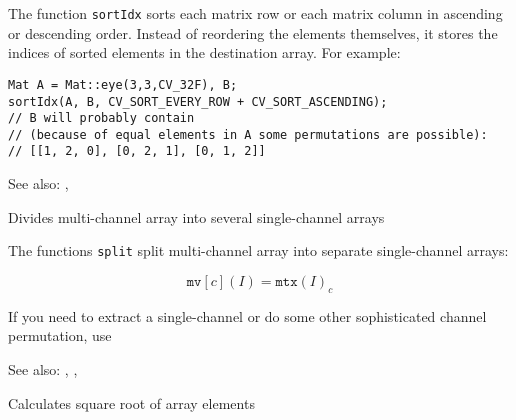 The function \texttt{sortIdx} sorts each matrix row or each matrix column in ascending or descending order. Instead of reordering the elements themselves, it stores the indices of sorted elements in the destination array. For example:

\begin{lstlisting}
Mat A = Mat::eye(3,3,CV_32F), B;
sortIdx(A, B, CV_SORT_EVERY_ROW + CV_SORT_ASCENDING);
// B will probably contain
// (because of equal elements in A some permutations are possible):
// [[1, 2, 0], [0, 2, 1], [0, 1, 2]]
\end{lstlisting}

See also: , 

Divides multi-channel array into several single-channel arrays

\begin{description}
\end{description}

The functions \texttt{split} split multi-channel array into separate single-channel arrays:

\[ \texttt{mv}[c](I) = \texttt{mtx}(I)_c \]

If you need to extract a single-channel or do some other sophisticated channel permutation, use 

See also: , , 

Calculates square root of array elements

\begin{description}
\end{description}

